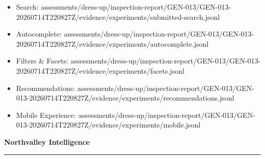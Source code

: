 \documentclass[10pt]{article}
\newcommand{\ReportFine}[1]{{\fontsize{7.6}{9.1}\selectfont\color{NVIMuted}#1}}
\begin{document}
\begin{itemize}
\item \ReportFine{Search: assessments/dress-up/inspection-report/GEN-013/GEN-013-20260714T220827Z/evidence/experiments/submitted-search.jsonl}
\item \ReportFine{Autocomplete: assessments/dress-up/inspection-report/GEN-013/GEN-013-20260714T220827Z/evidence/experiments/autocomplete.jsonl}
\item \ReportFine{Filters \& Facets: assessments/dress-up/inspection-report/GEN-013/GEN-013-20260714T220827Z/evidence/experiments/facets.jsonl}
\item \ReportFine{Recommendations: assessments/dress-up/inspection-report/GEN-013/GEN-013-20260714T220827Z/evidence/experiments/recommendations.jsonl}
\item \ReportFine{Mobile Experience: assessments/dress-up/inspection-report/GEN-013/GEN-013-20260714T220827Z/evidence/experiments/mobile.jsonl}
\end{itemize}
\vfill
\begin{center}
{\fontsize{16}{19}\selectfont\bfseries\color{NVIInk}Northvalley Intelligence}\\[0.06in]
{\color{NVIAccent}\rule{2.2in}{0.8pt}}\\[0.08in]
\ReportFine{\NorthvalleyContactLine}
\end{center}
\end{document}
